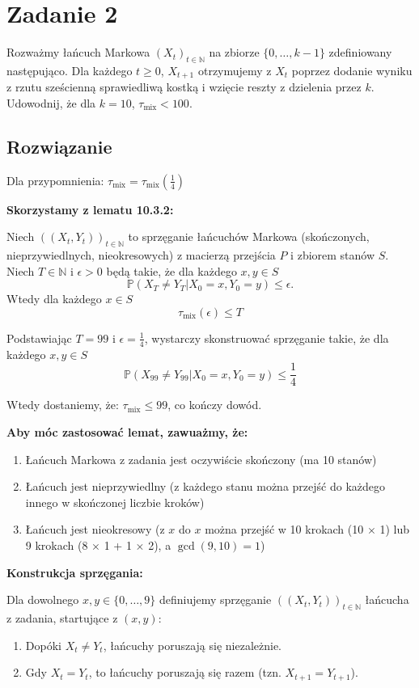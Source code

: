 \section{Zadanie 2}
Rozważmy łańcuch Markowa \((X_t)_{t \in \mathbb{N}}\) na zbiorze \(\{0, \ldots, k-1\}\) zdefiniowany następująco. Dla każdego \(t \geq 0\), \(X_{t+1}\) otrzymujemy z \(X_t\) poprzez dodanie wyniku z rzutu sześcienną sprawiedliwą kostką i wzięcie reszty z dzielenia przez \(k\). Udowodnij, że dla \(k = 10\), \(\tau_{\text{mix}} < 100\).

\subsection*{Rozwiązanie}

Dla przypomnienia: \(\tau_{\text{mix}} = \tau_{\text{mix}}(\frac{1}{4})\)

\textbf{Skorzystamy z lematu 10.3.2:}

Niech \(((X_t, Y_t))_{t \in \mathbb{N}}\) to sprzęganie łańcuchów Markowa (skończonych, nieprzywiedlnych, nieokresowych)
z macierzą przejścia \(P\) i zbiorem stanów \(S\).
Niech \(T \in \mathbb{N}\) i \(\epsilon > 0\) będą takie, że dla każdego \(x, y \in S\)
\[\mathbb{P}(X_T \neq Y_T | X_0 = x, Y_0 = y) \leq \epsilon.\]
Wtedy dla każdego \(x \in S\)
\[\tau_{\text{mix}} (\epsilon) \leq T\]

Podstawiając \(T = 99\) i \(\epsilon = \frac{1}{4}\), wystarczy skonstruować sprzęganie takie, że dla każdego \(x, y \in S\)
\[\mathbb{P}(X_{99} \neq Y_{99} | X_0 = x, Y_0 = y) \leq \frac{1}{4}\]

Wtedy dostaniemy, że:
\(\tau_{\text{mix}} \leq 99\),
co kończy dowód.

\textbf{Aby móc zastosować lemat, zawuażmy, że:}
\begin{enumerate}
	\item Łańcuch Markowa z zadania jest oczywiście skończony (ma 10 stanów)
	\item Łańcuch jest nieprzywiedlny (z każdego stanu można przejść do każdego innego w skończonej liczbie kroków)
	\item Łańcuch jest nieokresowy (z \(x\) do \(x\) można przejść w 10 krokach (10 \(\times\) 1) lub 9 krokach (8 \(\times\) 1 + 1 \(\times\) 2), a \(\gcd(9, 10) = 1\))
\end{enumerate}

\textbf{Konstrukcja sprzęgania:}

Dla dowolnego \(x, y \in \{0, \ldots, 9\}\) definiujemy sprzęganie \(((X_t, Y_t))_{t \in \mathbb{N}}\) łańcucha z zadania, startujące z \((x, y)\):
\begin{enumerate}
	\item Dopóki \(X_t \neq Y_t\), łańcuchy poruszają się niezależnie.
	\item Gdy \(X_t = Y_t\), to łańcuchy poruszają się razem (tzn. \(X_{t+1} = Y_{t+1}\)).
\end{enumerate}

